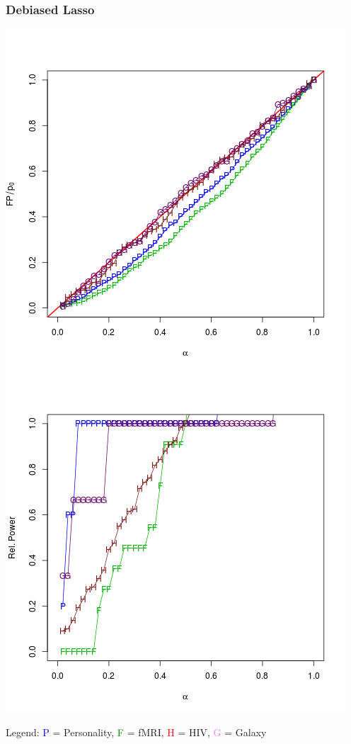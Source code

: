 \documentclass{beamer}
\begin{document}
\begin{frame}
\frametitle{Debiased Lasso}

\begin{center}
\includegraphics[scale = 0.3]{res_s_type1.png}
\includegraphics[scale = 0.3]{res_s_power.png}
\end{center}

Legend: \textcolor{blue}{P} = Personality, \textcolor{green}{F} = fMRI,
\textcolor{red}{H} = HIV, \textcolor{violet}{G} = Galaxy
\end{frame}
\end{document}
